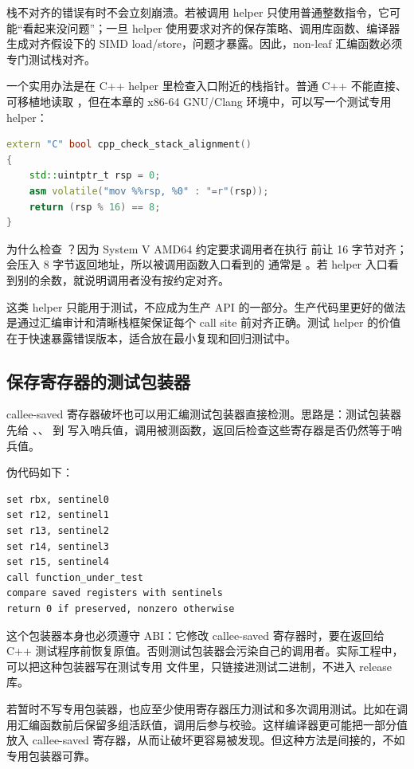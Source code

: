 栈不对齐的错误有时不会立刻崩溃。若被调用 helper 只使用普通整数指令，它可能“看起来没问题”；一旦 helper 使用要求对齐的保存策略、调用库函数、编译器生成对齐假设下的 SIMD load/store，问题才暴露。因此，non-leaf 汇编函数必须专门测试栈对齐。

一个实用办法是在 C++ helper 里检查入口附近的栈指针。普通 C++ 不能直接、可移植地读取 ，但在本章的 x86-64 GNU/Clang 环境中，可以写一个测试专用 helper：

\begin{lstlisting}[language=C++]
extern "C" bool cpp_check_stack_alignment()
{
    std::uintptr_t rsp = 0;
    asm volatile("mov %%rsp, %0" : "=r"(rsp));
    return (rsp % 16) == 8;
}
\end{lstlisting}

为什么检查 ？因为 System V AMD64 约定要求调用者在执行  前让  16 字节对齐； 会压入 8 字节返回地址，所以被调用函数入口看到的  通常是 。若 helper 入口看到别的余数，就说明调用者没有按约定对齐。

这类 helper 只能用于测试，不应成为生产 API 的一部分。生产代码里更好的做法是通过汇编审计和清晰栈框架保证每个 call site 前对齐正确。测试 helper 的价值在于快速暴露错误版本，适合放在最小复现和回归测试中。

\subsection{保存寄存器的测试包装器}

callee-saved 寄存器破坏也可以用汇编测试包装器直接检测。思路是：测试包装器先给 、、 到  写入哨兵值，调用被测函数，返回后检查这些寄存器是否仍然等于哨兵值。

伪代码如下：

\begin{lstlisting}
set rbx, sentinel0
set r12, sentinel1
set r13, sentinel2
set r14, sentinel3
set r15, sentinel4
call function_under_test
compare saved registers with sentinels
return 0 if preserved, nonzero otherwise
\end{lstlisting}

这个包装器本身也必须遵守 ABI：它修改 callee-saved 寄存器时，要在返回给 C++ 测试程序前恢复原值。否则测试包装器会污染自己的调用者。实际工程中，可以把这种包装器写在测试专用  文件里，只链接进测试二进制，不进入 release 库。

若暂时不写专用包装器，也应至少使用寄存器压力测试和多次调用测试。比如在调用汇编函数前后保留多组活跃值，调用后参与校验。这样编译器更可能把一部分值放入 callee-saved 寄存器，从而让破坏更容易被发现。但这种方法是间接的，不如专用包装器可靠。

